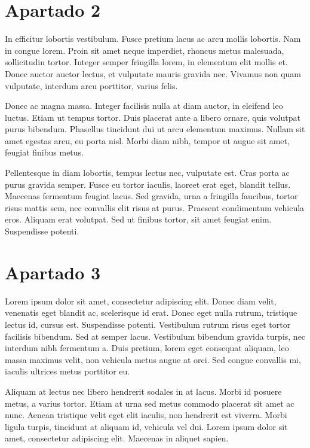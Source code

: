 \documentclass[
  13pt,
]{interact}
\begin{document}
\section{Apartado 2}\label{apartado-2}

In efficitur lobortis vestibulum. Fusce pretium lacus ac arcu mollis
lobortis. Nam in congue lorem. Proin sit amet neque imperdiet, rhoncus
metus malesuada, sollicitudin tortor. Integer semper fringilla lorem, in
elementum elit mollis et. Donec auctor auctor lectus, et vulputate
mauris gravida nec. Vivamus non quam vulputate, interdum arcu porttitor,
varius felis.

Donec ac magna massa. Integer facilisis nulla at diam auctor, in
eleifend leo luctus. Etiam ut tempus tortor. Duis placerat ante a libero
ornare, quis volutpat purus bibendum. Phasellus tincidunt dui ut arcu
elementum maximus. Nullam sit amet egestas arcu, eu porta nisl. Morbi
diam nibh, tempor ut augue sit amet, feugiat finibus metus.

Pellentesque in diam lobortis, tempus lectus nec, vulputate est. Cras
porta ac purus gravida semper. Fusce eu tortor iaculis, laoreet erat
eget, blandit tellus. Maecenas fermentum feugiat lacus. Sed gravida,
urna a fringilla faucibus, tortor risus mattis sem, nec convallis elit
risus at purus. Praesent condimentum vehicula eros. Aliquam erat
volutpat. Sed ut finibus tortor, sit amet feugiat enim. Suspendisse
potenti.

\section{Apartado 3}\label{apartado-3}

Lorem ipsum dolor sit amet, consectetur adipiscing elit. Donec diam
velit, venenatis eget blandit ac, scelerisque id erat. Donec eget nulla
rutrum, tristique lectus id, cursus est. Suspendisse potenti. Vestibulum
rutrum risus eget tortor facilisis bibendum. Sed at semper lacus.
Vestibulum bibendum gravida turpis, nec interdum nibh fermentum a. Duis
pretium, lorem eget consequat aliquam, leo massa maximus velit, non
vehicula metus augue at orci. Sed congue convallis mi, iaculis ultrices
metus porttitor eu.

Aliquam at lectus nec libero hendrerit sodales in at lacus. Morbi id
posuere metus, a varius tortor. Etiam at urna sed metus commodo placerat
sit amet ac nunc. Aenean tristique velit eget elit iaculis, non
hendrerit est viverra. Morbi ligula turpis, tincidunt at aliquam id,
vehicula vel dui. Lorem ipsum dolor sit amet, consectetur adipiscing
elit. Maecenas in aliquet sapien.
\end{document}
